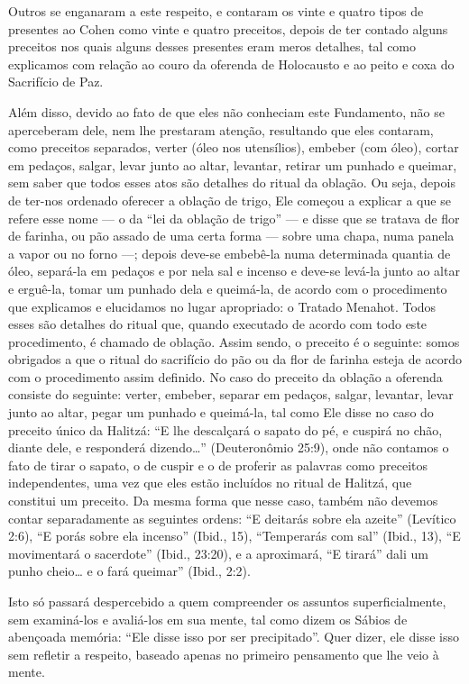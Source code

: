 Outros se enganaram a este respeito, e contaram os vinte e quatro tipos
de presentes ao Cohen como vinte e quatro preceitos, depois de ter
contado alguns preceitos nos quais alguns desses presentes eram meros
detalhes, tal como explicamos com relação ao couro da oferenda de
Holocausto e ao peito e coxa do Sacrifício de Paz.

Além disso, devido ao fato de que eles não conheciam este Fundamento,
não se aperceberam dele, nem lhe prestaram atenção, resultando que eles
contaram, como preceitos separados, verter (óleo nos utensílios),
embeber (com óleo), cortar em pedaços, salgar, levar junto ao altar,
levantar, retirar um punhado e queimar, sem saber que todos esses atos
são detalhes do ritual da oblação. Ou seja, depois de ter-nos ordenado
oferecer a oblação de trigo, Ele começou a explicar a que se refere esse
nome --- o da ``lei da oblação de trigo'' --- e disse que se tratava de
flor de farinha, ou pão assado de uma certa forma --- sobre uma chapa,
numa panela a vapor ou no forno ---; depois deve-se embebê-la numa
determinada quantia de óleo, separá-la em pedaços e por nela sal e
incenso e deve-se levá-la junto ao altar e erguê-la, tomar um punhado
dela e queimá-la, de acordo com o procedimento que explicamos e
elucidamos no lugar apropriado: o Tratado Menahot. Todos esses são
detalhes do ritual que, quando executado de acordo com todo este
procedimento, é chamado de oblação. Assim sendo, o preceito é o
seguinte: somos obrigados a que o ritual do sacrifício do pão ou da flor
de farinha esteja de acordo com o procedimento assim definido. No caso
do preceito da oblação a oferenda consiste do seguinte: verter,
embeber, separar em pedaços, salgar, levantar, levar junto ao altar,
pegar um punhado e queimá-la, tal como Ele disse no caso do preceito
único da Halitzá: ``E lhe descalçará o sapato do pé, e cuspirá no
chão, diante dele, e responderá dizendo\ldots{}'' (Deuteronômio 25:9), onde
não contamos o fato de tirar o sapato, o de cuspir e o de proferir as
palavras como preceitos independentes, uma vez que eles estão incluídos
no ritual de Halitzá, que constitui um preceito. Da mesma forma que
nesse caso, também não devemos contar separadamente as seguintes ordens:
``E deitarás sobre ela azeite'' (Levítico 2:6), ``E porás sobre ela
incenso'' (Ibid., 15), ``Temperarás com sal'' (Ibid., 13), ``E
movimentará o sacerdote'' (Ibid., 23:20), e a aproximará, ``E tirará''
dali um punho cheio\ldots{} e o fará queimar'' (Ibid., 2:2).

Isto só passará despercebido a quem compreender os assuntos
superficialmente, sem examiná-los e avaliá-los em sua mente, tal como
dizem os Sábios de abençoada memória: ``Ele disse isso por ser
precipitado''. Quer dizer, ele disse isso sem refletir a respeito,
baseado apenas no primeiro pensamento que lhe veio à mente.


